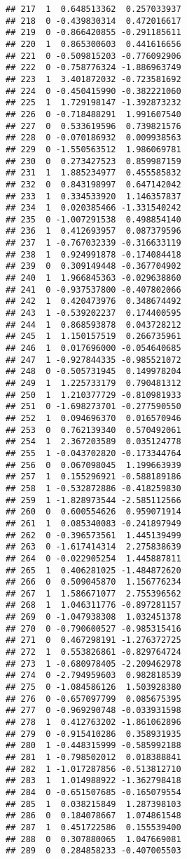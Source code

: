 \documentclass[
]{article}
\begin{document}
\begin{verbatim}
## 217  1  0.648513362  0.257033937
## 218  0 -0.439830314  0.472016617
## 219  0 -0.866420855 -0.291185611
## 220  1  0.865300603  0.441616656
## 221  0 -0.509815203 -0.776092906
## 222  0 -0.758776324 -1.886963749
## 223  1  3.401872032 -0.723581692
## 224  0 -0.450415990 -0.382221060
## 225  1  1.729198147 -1.392873232
## 226  0 -0.718488291  1.991607540
## 227  0  0.533619596  0.739821576
## 228  0 -0.070186932  0.009938563
## 229  0 -1.550563512  1.986069781
## 230  0  0.273427523  0.859987159
## 231  1  1.885234977  0.455585832
## 232  0  0.843198997  0.647142042
## 233  1  0.334533920  1.146357837
## 234  1  0.020385466 -1.331540242
## 235  0 -1.007291538  0.498854140
## 236  1  0.412693957  0.087379596
## 237  1 -0.767032339 -0.316633119
## 238  1  0.924991878 -0.174084418
## 239  0  0.309149448 -0.367704902
## 240  1  1.966845363 -0.029638860
## 241  0 -0.937537800 -0.407802066
## 242  1  0.420473976  0.348674492
## 243  1 -0.539202237  0.174400595
## 244  1  0.868593878  0.043728212
## 245  1  1.150157519  0.266735961
## 246  1  0.017696000 -0.054640685
## 247  1 -0.927844335 -0.985521072
## 248  0 -0.505731945  0.149978204
## 249  1  1.225733179  0.790481312
## 250  1  1.210377729 -0.810981933
## 251  0 -1.698273701 -0.277590550
## 252  1  0.094696370  0.016570946
## 253  0  0.762139340  0.570492061
## 254  1  2.367203589  0.035124778
## 255  1 -0.043702820 -0.173344764
## 256  0  0.067098045  1.199663939
## 257  1  0.155296921 -0.588189186
## 258  1 -0.532872886 -0.418259830
## 259  1 -1.828973544 -2.585112566
## 260  0  0.600554626  0.959071914
## 261  1  0.085340083 -0.241897949
## 262  0 -0.396573561  1.445139499
## 263  0 -1.617414314  2.275838639
## 264  0 -0.022905254  1.445887811
## 265  1  0.406281025 -1.484872620
## 266  0  0.509045870  1.156776234
## 267  1  1.586671077  2.755396562
## 268  1  1.046311776 -0.897281157
## 269  0 -1.047938308  1.032451378
## 270  0 -0.790600527 -0.985315416
## 271  0  0.467298191 -1.276372725
## 272  1  0.553826861 -0.829764724
## 273  1 -0.680978405 -2.209462978
## 274  0 -2.794959603  0.982818539
## 275  0 -1.084586126  1.503928380
## 276  0 -0.657097799  0.085675395
## 277  0 -0.969290748 -0.033931598
## 278  1  0.412763202 -1.861062896
## 279  0 -0.915410286  0.358931935
## 280  1 -0.448315999 -0.585992188
## 281  1 -0.798502012  0.018388841
## 282  1 -1.017287856 -0.513812710
## 283  1  1.014988922 -1.362798418
## 284  0 -0.651507685 -0.165079554
## 285  1  0.038215849  1.287398103
## 286  0  0.184078667  1.074861548
## 287  1  0.451722586  0.155539400
## 288  0  0.307880065  1.047669081
## 289  0  0.284858233 -0.407005503

\end{verbatim}
\end{document}
